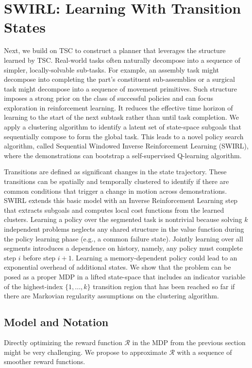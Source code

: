 \section{SWIRL: Learning With Transition States}
\label{swirl}
Next, we build on TSC to construct a planner that leverages the structure learned by TSC.
Real-world tasks often naturally decompose into a sequence of simpler, locally-solvable sub-tasks.
For example, an assembly task might decompose into completing the part's constituent sub-assemblies or a surgical task might decompose into a sequence of movement primitives.
Such structure imposes a strong prior on the class of successful policies and can focus exploration in reinforcement learning.
It reduces the effective time horizon of learning to the start of the next subtask rather than until task completion.
We apply a clustering algorithm to identify a latent set of state-space subgoals that sequentially compose to form the global task.
This leads to a novel policy search algorithm, called Sequential Windowed Inverse Reinforcement Learning (SWIRL),  where the demonstrations can bootstrap a self-supervised Q-learning algorithm.

 Transitions are defined as significant changes in the state trajectory. These transitions can be spatially and temporally clustered to identify if there are common conditions that trigger a change in motion across demonstrations.
SWIRL extends this basic model with an Inverse Reinforcement Learning step that extracts subgoals and computes local cost functions from the learned clusters. 
Learning a policy over the segmented task is nontrivial because solving $k$ independent problems neglects any shared structure in the value function during the policy learning phase (e.g., a common failure state).
Jointly learning over all segments introduces a dependence on history, namely, any policy must complete step $i$ before step $i+1$.
Learning a memory-dependent policy could lead to an exponential overhead of additional states. 
We show that the problem can be posed as a proper MDP in a lifted state-space that includes an indicator variable of the highest-index $\{1,...,k\}$ transition region that has been reached so far if there are Markovian regularity assumptions on the clustering algorithm.

\subsection*{Model and Notation}
Directly optimizing the reward function $\mathcal{R}$ in the MDP from the previous section might be very challenging.
We propose to approximate $\mathcal{R}$ with a sequence of smoother reward functions.

